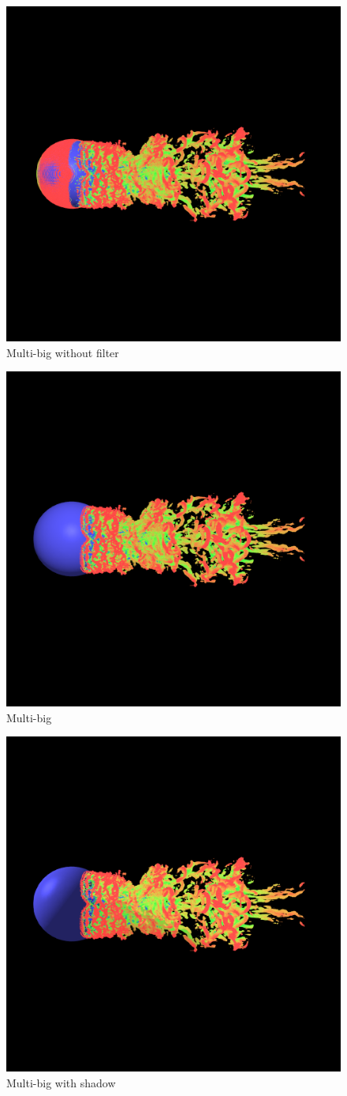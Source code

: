 \documentclass[acmtog]{acmart}
\begin{document}
\begin{figure}[H]
	\centering
	\includegraphics[width = 0.67\linewidth]{images/result_m_b_nf.png}
	\caption{Multi-big without filter}
\end{figure}
\begin{figure}[H]
	\centering
	\includegraphics[width = 0.67\linewidth]{images/result_m_b_f.png}
	\caption{Multi-big}
\end{figure}
\begin{figure}[H]
	\centering
	\includegraphics[width = 0.67\linewidth]{images/multi_big_shade.png}
	\caption{Multi-big with shadow}
\end{figure}
\end{document}
